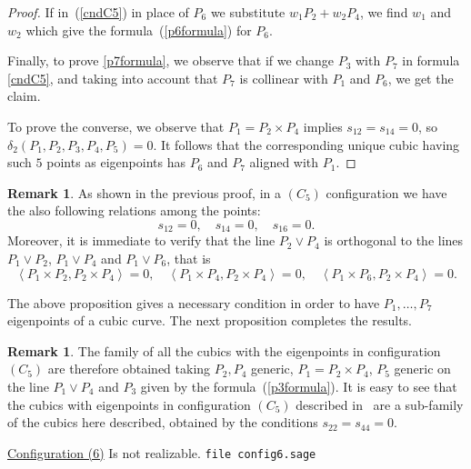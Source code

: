 \documentclass{amsart}
\theoremstyle{plain}
\theoremstyle{definition}
\newtheorem{rmk}[lemma]{Remark}
\newcommand{\scl}[2]{\left\langle {#1}, {#2} \right\rangle}
\begin{document}
\begin{proof}
If in~(\ref{cndC5}) in place of $P_6$ we substitute $w_1P_2+w_2P_4$,
we find $w_1$ and $w_2$ which give the formula~(\ref{p6formula}) for $P_6$.

Finally, to prove \eqref{p7formula}, we observe that if we change $P_3$ with $P_7$ in formula \eqref{cndC5}, and taking into account that $P_7$ is collinear with $P_1$ and $P_6$, we get the claim.




To prove the converse, we observe that $P_1= P_2 \times P_4$ implies
$s_{12}=s_{14}=0$, so $\delta_2 (P_1,P_2,P_3,P_4,P_5)=0$. It follows that the corresponding unique cubic having such $5$ points as eigenpoints has $P_6$ and $P_7$ aligned with $P_1$.
\end{proof}

\begin{rmk}
As shown in the previous proof,
    in a $(C_5)$ configuration we
have the also following relations among the points:
\[
s_{12} = 0, \quad s_{14} = 0, \quad s_{16} = 0.
\]
Moreover, it is
immediate to verify that the line $P_2\vee P_4$ is orthogonal to the
lines $P_1\vee P_2$, $P_1\vee P_4$ and $P_1\vee P_6$, that is
\[
\scl{P_1\times P_2}{P_2\times P_4} = 0, \quad
\scl{P_1\times P_4}{P_2\times P_4} = 0, \quad
\scl{P_1\times P_6}{P_2\times P_4} = 0.
\]
\end{rmk}


The above proposition gives a necessary condition in order to have
$P_1, \dots, P_7$ eigenpoints of a cubic curve. The next proposition
completes the results.

    

\begin{rmk}
The family of all the cubics with the eigenpoints in configuration $(C_5)$
are therefore obtained taking $P_2, P_4$ generic, $P_1 = P_2 \times P_4$,
$P_5$ generic on the line $P_1\vee P_4$ and $P_3$ given by the
formula~(\ref{p3formula}).
It is easy to see that the cubics with eigenpoints in configuration $(C_5)$
described in~ are a sub-family of the cubics here described,
obtained by the conditions $s_{22} = s_{44} = 0$.
\end{rmk}


\underline{Configuration (6)} Is not realizable.
\verb+file config6.sage+
\end{document}
